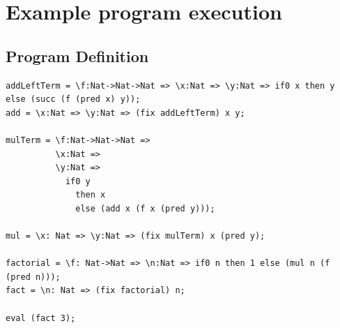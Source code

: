 \documentclass[12pt,a4paper]{report}
\theoremstyle{definition}
\theoremstyle{definition}
\theoremstyle{remark}
\begin{document}
\chapter{Example program execution}\label{appendix: term evaluations}
\section{Program Definition}
\begin{verbatim}
addLeftTerm = \f:Nat->Nat->Nat => \x:Nat => \y:Nat => if0 x then y else (succ (f (pred x) y));
add = \x:Nat => \y:Nat => (fix addLeftTerm) x y;

mulTerm = \f:Nat->Nat->Nat => 
          \x:Nat => 
          \y:Nat => 
            if0 y 
              then x 
              else (add x (f x (pred y)));

mul = \x: Nat => \y:Nat => (fix mulTerm) x (pred y);

factorial = \f: Nat->Nat => \n:Nat => if0 n then 1 else (mul n (f (pred n)));
fact = \n: Nat => (fix factorial) n;

eval (fact 3);

\end{verbatim}
\end{document}
